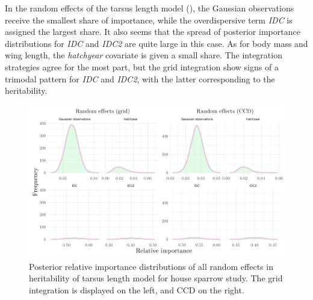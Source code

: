 In the random effects of the tarsus length model (), the Gaussian observations receive the smallest share of importance, while the overdispersive term \textit{IDC} is assigned the largest share. It also seems that the spread of posterior importance distributions for \textit{IDC} and \textit{IDC2} are quite large in this case. As for body mass and wing length, the \textit{hatchyear} covariate is given a small share. The integration strategies agree for the most part, but the grid integration show signs of a trimodal pattern for \textit{IDC} and \textit{IDC2}, with the latter corresponding to the heritability.
\begin{figure}[H]%
  \centering
  \includegraphics[width=1\linewidth]{Figures/House sparrow study/Tarsus_random.png}
  \caption[Posterior relative importance distributions of all random effects in tarsus length model for house sparrow study]{Posterior relative importance distributions of all random effects in heritability of tarsus length model for house sparrow study. The grid integration is displayed on the left, and CCD on the right.}
  \label{fig:tarsus_random_sparrows}
\end{figure}


